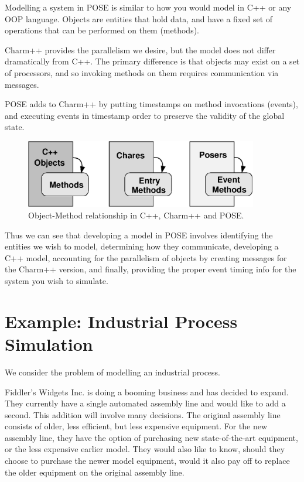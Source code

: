 \documentclass[10pt]{article}
\begin{document}
Modelling a system in POSE is similar to how you would model in C++ or
any OOP language.  Objects are entities that hold data, and have a
fixed set of operations that can be performed on them (methods).

Charm++ provides the parallelism we desire, but the model does not
differ dramatically from C++.  The primary difference is that objects
may exist on a set of processors, and so invoking methods on them
requires communication via messages. 

POSE adds to Charm++ by putting timestamps on method invocations
(events), and executing events in timestamp order to preserve the
validity of the global state.

\begin{figure}[h]
\begin{center}
\includegraphics[width=4in]{oopdes}
\end{center}
\caption{Object-Method relationship in C++, Charm++ and POSE.}
\label{fig:oopdes}
\end{figure}

Thus we can see that developing a model in POSE involves identifying
the entities we wish to model, determining how they communicate,
developing a C++ model, accounting for the parallelism of objects by
creating messages for the Charm++ version, and finally, providing the
proper event timing info for the system you wish to simulate.

\section{Example: Industrial Process Simulation}

We consider the problem of modelling an industrial process.  

Fiddler's Widgets Inc. is doing a booming business and has decided to
expand.  They currently have a single automated assembly line and
would like to add a second.  This addition will involve many
decisions.  The original assembly line consists of older, less
efficient, but less expensive equipment.  For the new assembly line,
they have the option of purchasing new state-of-the-art equipment, or
the less expensive earlier model.  They would also like to know,
should they choose to purchase the newer model equipment, would it
also pay off to replace the older equipment on the original assembly
line.
\end{document}
